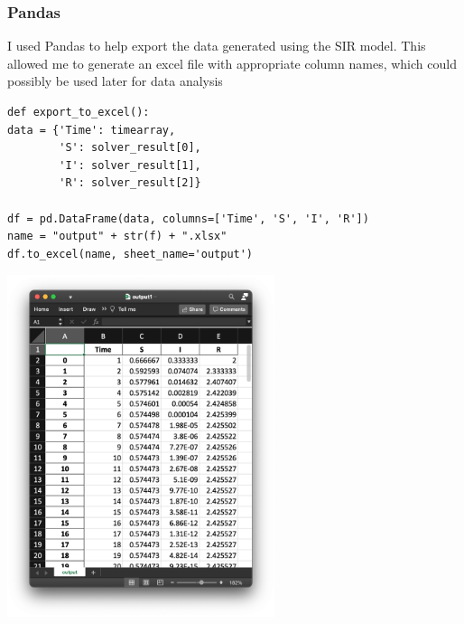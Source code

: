 \documentclass[11pt, a4paper]{article}
\begin{document}
\subsubsection{Pandas}
I used Pandas to help export the data generated using the SIR model. This allowed me to generate an excel file with appropriate column names, which could possibly be used later for data analysis
\begin{lstlisting}
def export_to_excel():
data = {'Time': timearray,
        'S': solver_result[0],
        'I': solver_result[1],
        'R': solver_result[2]}

df = pd.DataFrame(data, columns=['Time', 'S', 'I', 'R'])
name = "output" + str(f) + ".xlsx"
df.to_excel(name, sheet_name='output')
\end{lstlisting}
\begin{center}
    \includegraphics[height=10cm, width=\linewidth, keepaspectratio]{p_pan.png}
\end{center}
\end{document}
